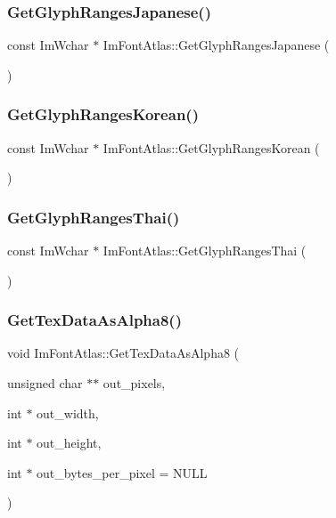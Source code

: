\subsubsection{\texorpdfstring{Get\+Glyph\+Ranges\+Japanese()}{GetGlyphRangesJapanese()}}
{\footnotesize\ttfamily const Im\+Wchar $\ast$ Im\+Font\+Atlas\+::\+Get\+Glyph\+Ranges\+Japanese (\begin{DoxyParamCaption}{ }\end{DoxyParamCaption})}

\hypertarget{struct_im_font_atlas_ac70e07bd35913661c8fc50413b3bf969}{}\label{struct_im_font_atlas_ac70e07bd35913661c8fc50413b3bf969} 
\subsubsection{\texorpdfstring{Get\+Glyph\+Ranges\+Korean()}{GetGlyphRangesKorean()}}
{\footnotesize\ttfamily const Im\+Wchar $\ast$ Im\+Font\+Atlas\+::\+Get\+Glyph\+Ranges\+Korean (\begin{DoxyParamCaption}{ }\end{DoxyParamCaption})}

\hypertarget{struct_im_font_atlas_a4985c51d8a5270ff027f13fa44a14371}{}\label{struct_im_font_atlas_a4985c51d8a5270ff027f13fa44a14371} 
\subsubsection{\texorpdfstring{Get\+Glyph\+Ranges\+Thai()}{GetGlyphRangesThai()}}
{\footnotesize\ttfamily const Im\+Wchar $\ast$ Im\+Font\+Atlas\+::\+Get\+Glyph\+Ranges\+Thai (\begin{DoxyParamCaption}{ }\end{DoxyParamCaption})}

\hypertarget{struct_im_font_atlas_aeff1a1044a1ab68d8f27bb2819cd9f44}{}\label{struct_im_font_atlas_aeff1a1044a1ab68d8f27bb2819cd9f44} 
\subsubsection{\texorpdfstring{Get\+Tex\+Data\+As\+Alpha8()}{GetTexDataAsAlpha8()}}
{\footnotesize\ttfamily void Im\+Font\+Atlas\+::\+Get\+Tex\+Data\+As\+Alpha8 (\begin{DoxyParamCaption}\item[{unsigned char $\ast$$\ast$}]{out\+\_\+pixels,  }\item[{int $\ast$}]{out\+\_\+width,  }\item[{int $\ast$}]{out\+\_\+height,  }\item[{int $\ast$}]{out\+\_\+bytes\+\_\+per\+\_\+pixel = {\ttfamily NULL} }\end{DoxyParamCaption})}


